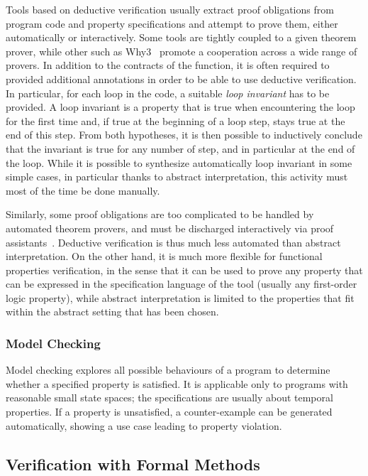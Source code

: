 \documentclass{template/openetcs_report}
\begin{document}
%
Tools based on deductive verification usually extract proof obligations 
from program code and property specifications and attempt to 
prove them, either automatically or interactively. Some tools are tightly
coupled to a given theorem prover, while other such as Why3~\cite{why3} 
promote a cooperation across a wide range of provers.
%
In addition to the contracts of the function, it is often required to provided
additional annotations in order to be able to use deductive verification. In
particular, for each loop in the code, a suitable \emph{loop invariant} has
to be provided. A loop invariant is a property that is true when encountering
the loop for the first time and, if true at the beginning of a loop step, stays
true at the end of this step. From both hypotheses, it is then possible to
inductively conclude that the invariant is true for any number of step, and in
particular at the end of the loop. While it is possible to synthesize
automatically loop invariant in some simple cases, in particular thanks to
abstract interpretation, this activity must most of the time be done manually.

Similarly, some proof obligations are too complicated to be handled by automated
theorem provers, and must be discharged interactively via proof
assistants~\cite{coq,isabelle}. Deductive verification is thus much less
automated than abstract interpretation. On the other hand, it is much more
flexible for functional properties verification, in the sense that it can be
used to prove any property that can be expressed in the specification language
of the tool (usually any first-order logic property), while abstract
interpretation is limited to the properties that fit within the abstract setting
that has been chosen.

\subsubsection{Model Checking}
\label{sec:Model Checking}

Model checking
\cite{Clarke.Schlingloff.2001}\nocite{Robinson.Voronkov.2001}
explores all possible behaviours of a program to
determine whether a specified property is satisfied.
%
It is applicable only to programs with reasonable small state spaces;
the specifications are usually about temporal properties.
%
If a property is unsatisfied, a counter-example can be generated
automatically,
showing a use case leading to property violation.


\subsection{Verification with Formal Methods}
\end{document}
